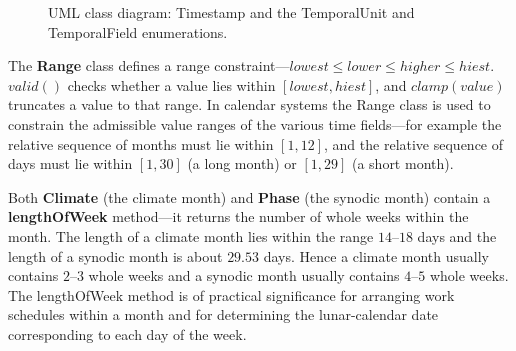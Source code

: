 \begin{figure}[htbp]
{%
    }
    \caption{UML class diagram: Timestamp and the TemporalUnit and TemporalField enumerations.}
    \label{fig:uml_timestamp}
\end{figure}

\begin{remark}\label{rem:range_class}
The \textbf{Range} class defines a range constraint---\(lowest\le lower\le higher\le hiest\). \(valid()\) checks whether a value lies within \([lowest,hiest]\), and \(clamp(value)\) truncates a value to that range. In calendar systems the Range class is used to constrain the admissible value ranges of the various time fields---for example the relative sequence of months must lie within \([1,12]\), and the relative sequence of days must lie within \([1,30]\) (a long month) or \([1,29]\) (a short month).
\end{remark}

\begin{remark}\label{rem:climate_phase_length}
Both \textbf{Climate} (the climate month) and \textbf{Phase} (the synodic month) contain a \textbf{lengthOfWeek} method---it returns the number of whole weeks within the month. The length of a climate month lies within the range \(14\)--\(18\) days and the length of a synodic month is about \(29.53\) days. Hence a climate month usually contains \(2\)--\(3\) whole weeks and a synodic month usually contains \(4\)--\(5\) whole weeks. The lengthOfWeek method is of practical significance for arranging work schedules within a month and for determining the lunar-calendar date corresponding to each day of the week.
\end{remark}

